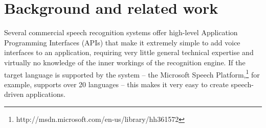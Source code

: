 \documentclass[11pt]{article}
\begin{document}
\section{Background and related work}
\label{sec:background}
Several commercial speech recognition systems offer high-level Application Programming Interfaces (APIs) that 
make it extremely simple to add voice interfaces to an application, requiring
very little general technical expertise and virtually no knowledge of the inner workings of the recognition engine. If the target language is supported by the system -- the Microsoft Speech Platform,\footnote{http://msdn.microsoft.com/en-us/library/hh361572} for example, supports 
over 20 languages 
-- this makes it very easy 
to create speech-driven applications. 
\end{document}
